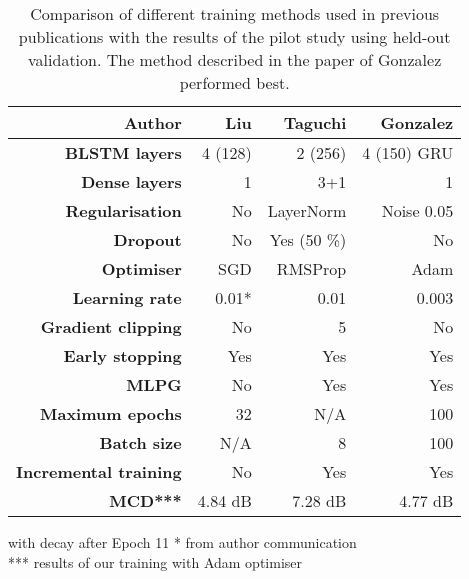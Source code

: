 \documentclass[a4paper]{article}
\begin{document}
%

\begin{table}[th]
  \caption{Comparison of different training methods used in previous publications with the
    results of the pilot study using held-out validation. The method described in the paper of
  Gonzalez performed best.}
  \vspace{1em}
  \label{tab:architectures}
  \centering
  \footnotesize

  \begin{tabular}{ r r r r }
    \toprule
    \textbf{Author} & \textbf{Liu} & \textbf{Taguchi} & \textbf{Gonzalez} \\
    \midrule
    \textbf{BLSTM layers} & 4 (128) & 2 (256) & 4 (150) GRU \\
    \textbf{Dense layers} & 1 & 3+1 & 1 \\
    \textbf{Regularisation} & No & LayerNorm & Noise 0.05 \\
    \textbf{Dropout} & No & Yes (50 \%) & No \\
    \textbf{Optimiser} & SGD & RMSProp & Adam \\
    \textbf{Learning rate} & 0.01* & 0.01 & 0.003 \\
    \textbf{Gradient clipping} & No & 5 & No \\
    \textbf{Early stopping} & Yes & Yes & Yes \\
    \textbf{MLPG} \cite{Wu2016} & No & Yes & Yes \\ 
    \textbf{Maximum epochs} & 32 & N/A & 100 \\
    \textbf{Batch size} & N/A & 8 & 100 \\
    \textbf{Incremental training} & No & Yes & Yes \\
    \textbf{MCD***} & 4.84 dB & 7.28 dB & 4.77 dB \\
    \bottomrule
  \end{tabular}
  \scriptsize * with decay after Epoch 11 \scriptsize ** from author communication \\
  *** results of our training with Adam optimiser
  \vspace{-2em}
\end{table}
\end{document}
